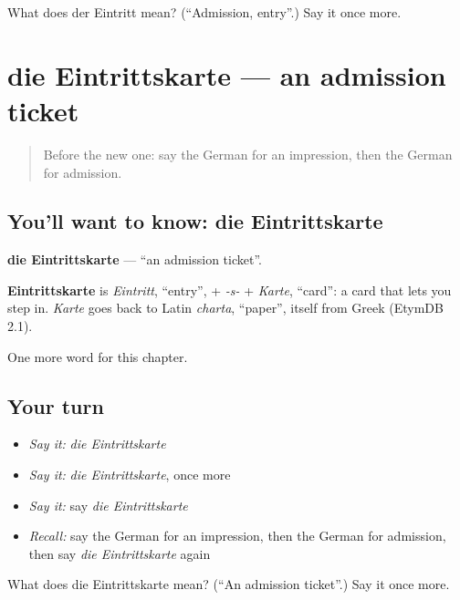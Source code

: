 \begin{tcolorbox}[breakable,colback=teal!4,colframe=teal!35!black,title={Before you move on}]
What does der Eintritt mean? (\textquotedblleft{}Admission, entry\textquotedblright{}.) Say it once more.
\end{tcolorbox}
\section[die Eintrittskarte]{die Eintrittskarte — an admission ticket}

\label{lesson:GE-C227-eintrittskarte}



\begin{quote}
Before the new one: say the German for an impression, then the German for admission.
\end{quote}

\subsection*{You'll want to know: die Eintrittskarte}
\textbf{die Eintrittskarte} — \textquotedblleft{}an admission ticket\textquotedblright{}.

\begin{cousinweb}
\textbf{Eintrittskarte} is \emph{Eintritt}, \textquotedblleft{}entry\textquotedblright{}, + \emph{-s-} + \emph{Karte}, \textquotedblleft{}card\textquotedblright{}: a card that lets you step in. \emph{Karte} goes back to Latin \emph{charta}, \textquotedblleft{}paper\textquotedblright{}, itself from Greek (EtymDB 2.1).
\end{cousinweb}

\begin{grammarlens}[title={What you've built}]
One more word for this chapter.
\end{grammarlens}

\subsection*{Your turn}
\begin{itemize}
\raggedright
  \item \emph{Say it:} \emph{die Eintrittskarte}
  \item \emph{Say it:} \emph{die Eintrittskarte}, once more
  \item \emph{Say it:} say \emph{die Eintrittskarte}
  \item \emph{Recall:} say the German for an impression, then the German for admission, then say \emph{die Eintrittskarte} again
\end{itemize}

\begin{tcolorbox}[breakable,colback=teal!4,colframe=teal!35!black,title={Before you move on}]
What does die Eintrittskarte mean? (\textquotedblleft{}An admission ticket\textquotedblright{}.) Say it once more.
\end{tcolorbox}
